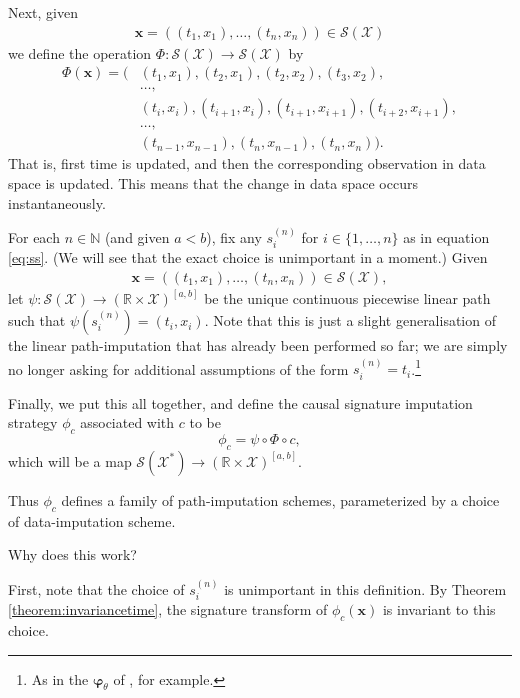 \documentclass{article}
\newcommand{\reals}{\mathbb{R}}
\newcommand{\naturals}{\mathbb{N}}
\newcommand{\dataspace}{\mathcal{X}}
\newcommand{\seriesspace}{\mathcal{S}}
\begin{document}
Next, given
\begin{align*}
    \mathbf{x} = ((t_1, x_1), \ldots, (t_n, x_n)) \in \seriesspace(\dataspace)
\end{align*}
we define the operation $\Phi \colon \seriesspace(\dataspace) \to \seriesspace(\dataspace)$ by
\begin{align}
    \Phi(\mathbf{x}) = (&(t_1, x_1), (t_2, x_1), (t_2, x_2),(t_3, x_2),\nonumber\\
    &\ldots,\nonumber\\
    &(t_i, x_i), (t_{i + 1}, x_i), (t_{i + 1}, x_{i + 1}), (t_{i + 2}, x_{i + 1}),\nonumber\\
    &\ldots,\nonumber\\
    &(t_{n - 1}, x_{n - 1}), (t_n, x_{n - 1}),(t_n, x_n)).\label{eq:causalsig}
\end{align}
That is, first time is updated, and then the corresponding observation in data space is updated. This means that the change in data space occurs instantaneously.

For each $n \in \naturals$ (and given $a < b$), fix any $s_i^{(n)}$ for $i \in \{1, \ldots, n \}$ as in equation \eqref{eq:ss}. (We will see that the exact choice is unimportant in a moment.) Given
\begin{align*}
    \mathbf{x} = ((t_1, x_1), \ldots, (t_n, x_n)) \in \seriesspace(\dataspace),
\end{align*}
let $\psi \colon \seriesspace(\dataspace) \to (\reals \times \dataspace)^{[a, b]}$ be the unique continuous piecewise linear path such that $\psi(s_i^{(n)}) = (t_i, x_i)$. Note that this is just a slight generalisation of the linear path-imputation that has already been performed so far; we are simply no longer asking for additional assumptions of the form $s_i^{(n)} = t_i$.\footnote{As in the $\mathbf{\varphi}_\theta$ of \cite{toth2019gp}, for example.}

Finally, we put this all together, and define the causal signature imputation strategy $\phi_c$ associated with $c$ to be
\begin{equation*}
\phi_c = \psi \circ \Phi \circ c,
\end{equation*}
which will be a map $\seriesspace(\dataspace^*) \to (\reals \times \dataspace)^{[a, b]}$.

Thus $\phi_c$ defines a family of path-imputation schemes, parameterized by a choice of data-imputation scheme.

Why does this work?

First, note that the choice of $s_i^{(n)}$ is unimportant in this definition. By Theorem \ref{theorem:invariancetime}, the signature transform of $\phi_c(\mathbf{x})$ is invariant to this choice.
\end{document}
